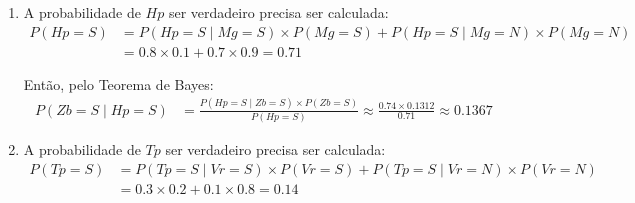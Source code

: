 \documentclass{../sftex/sftex}
\begin{document}
\begin{enumerate}[label= (\textbf{\arabic*})]
    \item A probabilidade de $Hp$ ser verdadeiro precisa ser calculada:
        \begin{align*}
            P(Hp = S) & =
                P(Hp = S \mid Mg = S) \times P(Mg = S)
                + P(Hp = S \mid Mg = N) \times P(Mg = N) \\
            & = 0.8 \times 0.1 + 0.7 \times 0.9 = 0.71
        \end{align*}

        Então, pelo Teorema de Bayes:
        \begin{align*}
            P(Zb = S \mid Hp = S) & =
                \frac{P(Hp = S \mid Zb = S) \times P(Zb = S)}{P(Hp = S)}
                \approx \frac{0.74 \times 0.1312}{0.71}
                \approx \boldsymbol{0.1367}
        \end{align*}

    \item A probabilidade de $Tp$ ser verdadeiro precisa ser calculada:
        \begin{align*}
            P(Tp = S) & =
                P(Tp = S \mid Vr = S) \times P(Vr = S)
                + P(Tp = S \mid Vr = N) \times P(Vr = N) \\
            & = 0.3 \times 0.2 + 0.1 \times 0.8 = 0.14
        \end{align*}


\end{enumerate}
\end{document}
